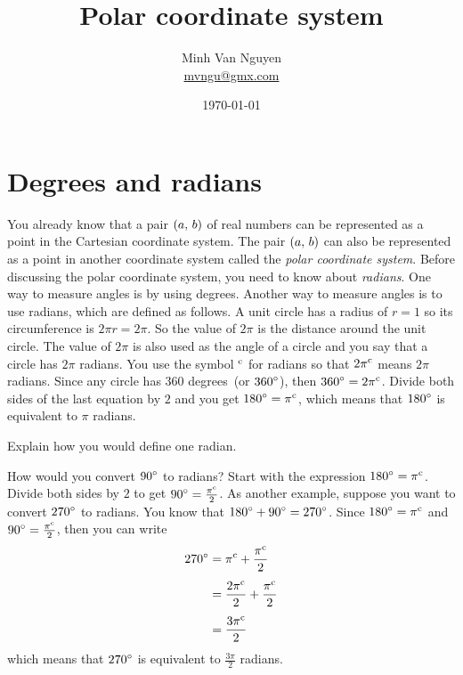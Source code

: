 \documentclass[a4paper,oneside,12pt]{article}
\begin{document}
\title{\Large\bf Polar coordinate system}
\author{%
  Minh Van Nguyen \\
  \url{mvngu@gmx.com}
}
\date{\today}
\maketitle



\section{Degrees and radians}

You already know that a pair $\tuple{a}{b}$ of real numbers can be
represented as a point in the Cartesian coordinate system.  The pair
$\tuple{a}{b}$ can also be represented as a point in another
coordinate system called the \emph{polar coordinate system}.  Before
discussing the polar coordinate system, you need to know about
\emph{radians}.  One way to measure angles is by using degrees.
Another way to measure angles is to use radians, which are defined as
follows.  A unit circle has a radius of $r = 1$ so its circumference
is $2 \pi r = 2 \pi$.  So the value of $2 \pi$ is the distance around
the unit circle.  The value of $2\pi$ is also used as the angle of a
circle and you say that a circle has $2\pi$ radians.  You use the
symbol $\radian{}$ for radians so that $\radian{2\pi}$ means $2\pi$
radians.  Since any circle has $360$ degrees~(or $\degree{360}$), then
$\degree{360} = \radian{2\pi}$.  Divide both sides of the last
equation by $2$ and you get $\degree{180} = \radian{\pi}$, which means
that $\degree{180}$ is equivalent to $\pi$ radians.

\begin{exercise}
Explain how you would define one radian.
\end{exercise}


How would you convert $\degree{90}$ to radians?  Start with the
expression $\degree{180} = \radian{\pi}$.  Divide both sides by $2$ to
get $\degree{90} = \frac{\radian{\pi}}{2}$.  As another example,
suppose you want to convert $\degree{270}$ to radians.  You know that
$\degree{180} + \degree{90} = \degree{270}$.  Since
$\degree{180} = \radian{\pi}$ and
$\degree{90} = \frac{\radian{\pi}}{2}$, then you can write
\begin{align*}
\degree{270}
&=
\radian{\pi} + \frac{\radian{\pi}}{2} \\[4pt]
&=
\frac{\radian{2\pi}}{2} + \frac{\radian{\pi}}{2} \\[4pt]
&=
\frac{\radian{3\pi}}{2}
\end{align*}
which means that $\degree{270}$ is equivalent to $\frac{3\pi}{2}$
radians.
\end{document}
